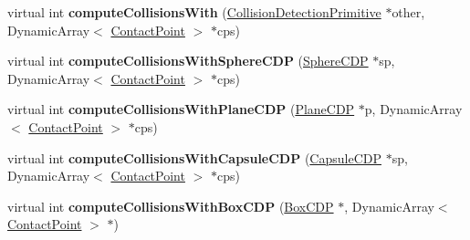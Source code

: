 \begin{DoxyCompactItemize}
\item 
\hypertarget{classCartWheel_1_1Physics_1_1SphereCDP_a157f4c0c0b11561b78d41eea0b206ec3}{
virtual int {\bfseries computeCollisionsWith} (\hyperlink{classCartWheel_1_1Physics_1_1CollisionDetectionPrimitive}{CollisionDetectionPrimitive} $\ast$other, DynamicArray$<$ \hyperlink{classCartWheel_1_1Physics_1_1ContactPoint}{ContactPoint} $>$ $\ast$cps)}
\label{classCartWheel_1_1Physics_1_1SphereCDP_a157f4c0c0b11561b78d41eea0b206ec3}

\item 
\hypertarget{classCartWheel_1_1Physics_1_1SphereCDP_ac9b44b86f7db30add2fbca62f0fd270c}{
virtual int {\bfseries computeCollisionsWithSphereCDP} (\hyperlink{classCartWheel_1_1Physics_1_1SphereCDP}{SphereCDP} $\ast$sp, DynamicArray$<$ \hyperlink{classCartWheel_1_1Physics_1_1ContactPoint}{ContactPoint} $>$ $\ast$cps)}
\label{classCartWheel_1_1Physics_1_1SphereCDP_ac9b44b86f7db30add2fbca62f0fd270c}

\item 
\hypertarget{classCartWheel_1_1Physics_1_1SphereCDP_aeb091e4d7e75526be2699151e7854a24}{
virtual int {\bfseries computeCollisionsWithPlaneCDP} (\hyperlink{classCartWheel_1_1Physics_1_1PlaneCDP}{PlaneCDP} $\ast$p, DynamicArray$<$ \hyperlink{classCartWheel_1_1Physics_1_1ContactPoint}{ContactPoint} $>$ $\ast$cps)}
\label{classCartWheel_1_1Physics_1_1SphereCDP_aeb091e4d7e75526be2699151e7854a24}

\item 
\hypertarget{classCartWheel_1_1Physics_1_1SphereCDP_aaf1eaf7dfdbcd6074425596e9ab68b60}{
virtual int {\bfseries computeCollisionsWithCapsuleCDP} (\hyperlink{classCartWheel_1_1Physics_1_1CapsuleCDP}{CapsuleCDP} $\ast$sp, DynamicArray$<$ \hyperlink{classCartWheel_1_1Physics_1_1ContactPoint}{ContactPoint} $>$ $\ast$cps)}
\label{classCartWheel_1_1Physics_1_1SphereCDP_aaf1eaf7dfdbcd6074425596e9ab68b60}

\item 
\hypertarget{classCartWheel_1_1Physics_1_1SphereCDP_a56c38a8f002c366d60db22be2cef5934}{
virtual int {\bfseries computeCollisionsWithBoxCDP} (\hyperlink{classCartWheel_1_1Physics_1_1BoxCDP}{BoxCDP} $\ast$, DynamicArray$<$ \hyperlink{classCartWheel_1_1Physics_1_1ContactPoint}{ContactPoint} $>$ $\ast$)}
\label{classCartWheel_1_1Physics_1_1SphereCDP_a56c38a8f002c366d60db22be2cef5934}

\end{DoxyCompactItemize}
